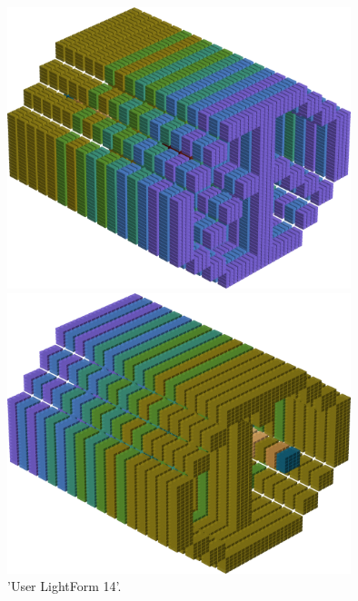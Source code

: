 \begin{minipage}[b]{0.48\linewidth}
\vspace{0.5cm}
\begin{figure}[H]
    \centering
    \begin{adjustbox}{width=4cm,margin=0cm 0cm}
      \includegraphics[width=10cm]{src/colorspace_patterns/pattern22-45.png}%
    \end{adjustbox}
    \begin{adjustbox}{width=4cm,margin=0cm 0cm}
      \includegraphics[width=10cm]{src/colorspace_patterns/pattern22-225.png}%
    \end{adjustbox}
\caption{'User LightForm 14'.}
\end{figure}
\end{minipage}
